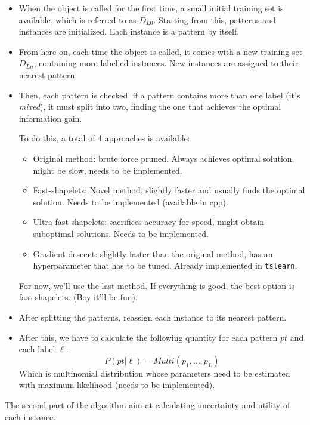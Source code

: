 \begin{itemize}
    \item When the object is called for the first time, a small initial training set
    is available, which is referred to as $D_{L0}$. Starting from this, patterns and 
    instances are initialized. Each instance is a pattern by itself.
    \item From here on, each time the object is called, it comes with a new training
    set $D_{Ln}$, containing more labelled instances. New instances are assigned to 
    their nearest pattern.
    \item Then, each pattern is checked, if a pattern contains more than one label 
    (it's \textit{mixed}), it must split into two, finding the one that achieves 
    the optimal information gain. 

    To do this, a total of 4 approaches is available:
    \begin{itemize}
        \item Original method: brute force pruned. Always achieves optimal solution, might be slow, 
        needs to be implemented.
        \item Fast-shapelets: Novel method, slightly faster and usually finds the optimal solution.
        Needs to be implemented (available in cpp). 
        \item Ultra-fast shapelets: sacrifices accuracy for speed, might obtain suboptimal solutions. 
        Needs to be implemented.
        \item Gradient descent: slightly faster than the original method, has an hyperparameter that has
        to be tuned. Already implemented in \texttt{tslearn}. 
    \end{itemize}
    For now, we'll use the last method. If everything is good, the best option is fast-shapelets. (Boy it'll be fun).
    \item After splitting the patterns, reassign each instance to its nearest pattern.
    \item After this, we have to calculate the following quantity for each pattern $pt$ and each label $\ell$:
    \begin{equation}
        P(pt | \ell) = Multi(p_1, \dots, p_L)
    \end{equation}
    Which is multinomial distribution whose parameters need to be estimated with maximum likelihood 
    (needs to be implemented).
\end{itemize}

The second part of the algorithm aim at calculating uncertainty and utility of each instance.

